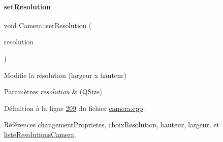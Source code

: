 \paragraph{\texorpdfstring{set\+Resolution}{setResolution}\hspace{0.1cm}{\footnotesize\ttfamily [2/3]}}
{\footnotesize\ttfamily void Camera\+::set\+Resolution (\begin{DoxyParamCaption}\item[{Q\+Size}]{resolution }\end{DoxyParamCaption})\hspace{0.3cm}{\ttfamily [slot]}}



Modifie la résolution (largeur x hauteur) 


\begin{DoxyParams}{Paramètres}
{\em resolution} & (Q\+Size) \\
\hline
\end{DoxyParams}


Définition à la ligne \hyperlink{camera_8cpp_source_l00209}{209} du fichier \hyperlink{camera_8cpp_source}{camera.\+cpp}.



Références \hyperlink{camera_8h_source_l00070}{changement\+Proprietes}, \hyperlink{camera_8h_source_l00072}{choix\+Resolution}, \hyperlink{camera_8h_source_l00066}{hauteur}, \hyperlink{camera_8h_source_l00065}{largeur}, et \hyperlink{camera_8h_source_l00071}{liste\+Resolutions\+Camera}.


